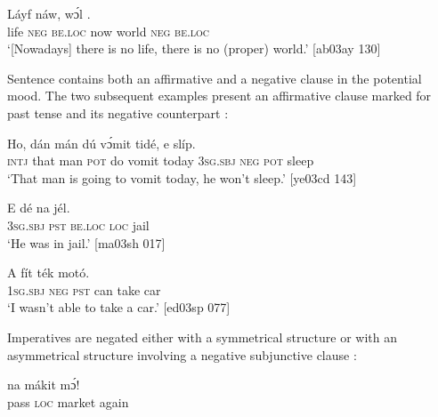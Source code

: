 \ea%
    \label{ex:key:534}
    \gll Láyf          náw,  wɔ́l      .\\
life    \textsc{neg}  \textsc{be.loc}  now    world  \textsc{neg}  \textsc{be.loc}\\

\glt ‘[Nowadays] there is no life, there is no (proper) world.’ [ab03ay 130]
\z

Sentence  contains both an affirmative and a negative clause in the potential mood. The two subsequent examples present an affirmative clause marked for past tense and its negative counterpart :


\ea%
    \label{ex:key:535}
    \gll Ho,  dán  mán      dú  vɔ́mit    tidé,    e        slíp.\\
\textsc{intj}  that  man    \textsc{pot}  do  vomit    today  \textsc{3sg.sbj}  \textsc{neg}  \textsc{pot}  sleep\\

\glt ‘That man is going to vomit today, he won’t sleep.’ [ye03cd 143]
\z


\ea%
    \label{ex:key:536}
    \gll E     dé  \textstylePichiexamplebold{} na  jél.\\
\textsc{3sg.sbj}  \textsc{pst}  \textsc{be.loc}  \textsc{loc}  jail\\

\glt ‘He was in jail.’ [ma03sh 017]
\z


\ea%
    \label{ex:key:537}
    \gll A       fít  ték    motó.\\
\textsc{1sg.sbj}  \textsc{neg}  \textsc{pst}  can  take    car\\

\glt ‘I wasn’t able to take a car.’ [ed03sp 077]
\z

Imperatives  are negated either with a symmetrical structure  or with an asymmetrical structure involving a negative subjunctive clause : 


\ea%
    \label{ex:key:538}
    \gll {}    na  mákit  mɔ́!\\
pass    \textsc{loc}  market  again\\

